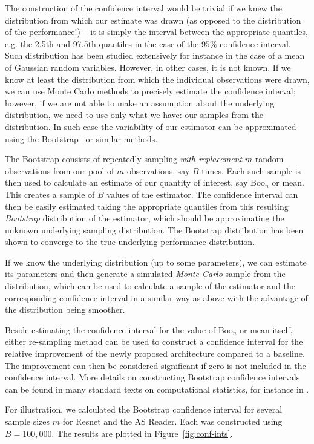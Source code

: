 \documentclass{article}
\newcommand{\cbtcn}{\gls{cbtcn}\xspace}
\newcommand{\boo}[1]{\text{Boo}_{#1}}
\newcommand{\Em}[1]{\boo{#1}}
\newcommand{\emn}{\Em{n}}
\begin{document}
\begin{appendices}
The construction of the confidence interval would be trivial if we knew the distribution from which our estimate was drawn (as opposed to the distribution of the performance!) -- it is simply the interval between the appropriate quantiles, e.g. the 2.5th and 97.5th quantiles in the case of the $95\%$ confidence interval. Such distribution has been studied extensively for instance in the case of a mean of Gaussian random variables. However, in other cases, it is not known. If we know at least the distribution from which the individual observations were drawn, we can use Monte Carlo methods to precisely estimate the confidence interval; however, if we are not able to make an assumption about the underlying distribution, we need to use only what we have: our samples from the distribution. In such case the variability of our estimator can be approximated using the Bootstrap~\citep{efron79} or similar methods. 

The Bootstrap consists of repeatedly sampling \emph{with replacement} $m$ random observations from our pool of $m$ observations, say $B$ times. Each such sample is then used to calculate an estimate of our quantity of interest, say $\emn$ or mean. This creates a sample of $B$ values of the estimator. The confidence interval can then be easily estimated taking the appropriate quantiles from this resulting \emph{Bootstrap} distribution of the estimator, which should be approximating the unknown underlying sampling distribution. The Bootstrap distribution has been shown to converge to the true underlying performance distribution.

If we know the underlying distribution (up to some parameters), we can estimate its parameters and then generate a simulated \emph{Monte Carlo} sample from the distribution, which can be used to calculate a sample of the estimator and the corresponding confidence interval in a similar way as above with the advantage of the distribution being smoother.


Beside estimating the confidence interval for the value of $\emn$ or mean itself, either re-sampling method can be used to construct a confidence interval for the relative improvement of the newly proposed architecture compared to a baseline. The improvement can then be considered significant if zero is not included in the confidence interval. More details on constructing Bootstrap confidence intervals can be found in many standard texts on computational statistics, for instance in \cite{efron1987better}.

For illustration, we calculated the Bootstrap confidence interval for several sample sizes $m$ for Resnet and the AS Reader. Each was constructed using $B=100,000$. The results are plotted in Figure~\ref{fig:conf-ints}.%








\end{appendices}
\end{document}
